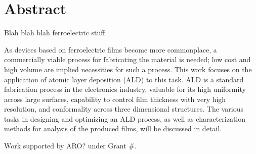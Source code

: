 \newpage
\chapter*{Abstract}


\noindent Blah blah blah ferroelectric stuff. 

As devices based on ferroelectric films become more commonplace, a commercially viable process for fabricating the material is needed; low cost and high volume are implied necessities for such a process. This work focuses on the application of atomic layer deposition (ALD) to this task. ALD is a standard fabrication process in the electronics industry, valuable for its high uniformity across large surfaces, capability to control film thickness with very high resolution, and conformality across three dimensional structures. The various tasks in designing and optimizing an ALD process, as well as characterization methods for analysis of the produced films, will be discussed in detail.

Work supported by ARO? under Grant \#.
